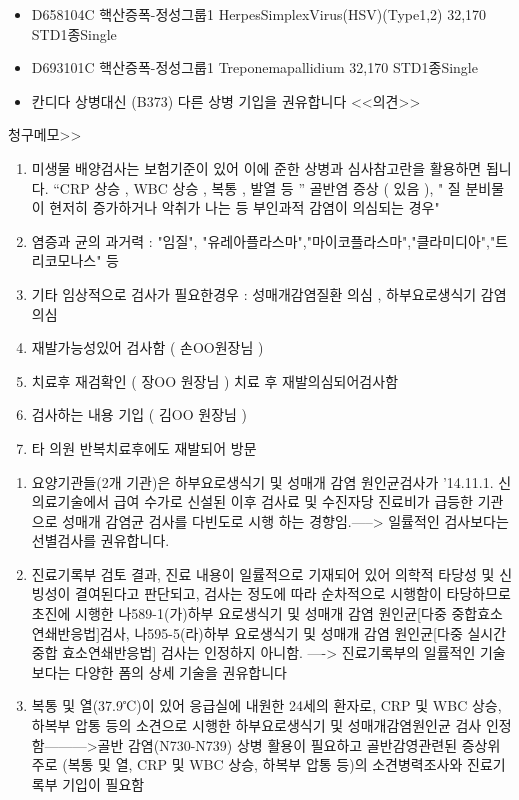 {\begin{itemize}
\item[\dschemical] D658104C	핵산증폭-정성그룹1 HerpesSimplexVirus(HSV)(Type1,2)	32,170 STD1종Single
\item[\dschemical] D693101C	핵산증폭-정성그룹1 Treponemapallidium	32,170 STD1종Single
\item[\dsjuridical] 칸디다 상병대신 (B373) 다른 상병 기입을 권유합니다 <<의견>>
\end{itemize}
청구메모>>
\begin{enumerate}\tightlist
\item 미생물 배양검사는 보험기준이 있어 이에 준한 상병과  심사참고란을  활용하면 됩니다. “CRP 상승 , WBC  상승 ,  복통 ,  발열 등 ” 골반염  증상 ( 있음 ), " 질 분비물이 현저히 증가하거나 악취가 나는 등 부인과적 감염이 의심되는 경우"
\item 염증과 균의  과거력 : "임질", "유레아플라스마","마이코플라스마","클라미디아","트리코모나스" 등
\item 기타 임상적으로 검사가  필요한경우 :  성매개감염질환  의심 ,  하부요로생식기 감염의심
\item 재발가능성있어   검사함 ( 손OO원장님 )
\item 치료후  재검확인 ( 장OO   원장님 )  치료 후 재발의심되어검사함
\item 검사하는   내용 기입 ( 김OO 원장님 )
\item 타 의원 반복치료후에도 재발되어 방문
\end{enumerate}
}
{\begin{enumerate}[1.]\tightlist
\item 요양기관들(2개 기관)은 하부요로생식기 및 성매개 감염 원인균검사가 '14.11.1. 신의료기술에서 급여 수가로 신설된 이후 검사료 및 수진자당 진료비가 급등한 기관으로 성매개 감염균 검사를 다빈도로 시행 하는 경향임.-----> 일률적인 검사보다는 선별검사를 권유합니다. 
\item 진료기록부 검토 결과, 진료 내용이 일률적으로 기재되어 있어 의학적 타당성 및 신빙성이 결여된다고 판단되고, 검사는 정도에 따라 순차적으로 시행함이 타당하므로 초진에 시행한 나589-1(가)하부 요로생식기 및 성매개 감염 원인균[다중 중합효소연쇄반응법]검사, 나595-5(라)하부 요로생식기 및 성매개 감염 원인균[다중 실시간 중합 효소연쇄반응법] 검사는 인정하지 아니함. ----> 진료기록부의 일률적인 기술보다는 다양한 폼의 상세 기술을 권유합니다 
\item 복통 및 열(37.9℃)이 있어 응급실에 내원한 24세의 환자로, CRP 및 WBC 상승, 하복부 압통 등의 소견으로 시행한 하부요로생식기 및 성매개감염원인균 검사 인정함--------->골반 감염(N730-N739) 상병 활용이 필요하고 골반감영관련된 증상위주로 (복통 및 열, CRP 및 WBC 상승, 하복부 압통 등)의 소견병력조사와 진료기록부 기입이 필요함 
\end{enumerate}
}

